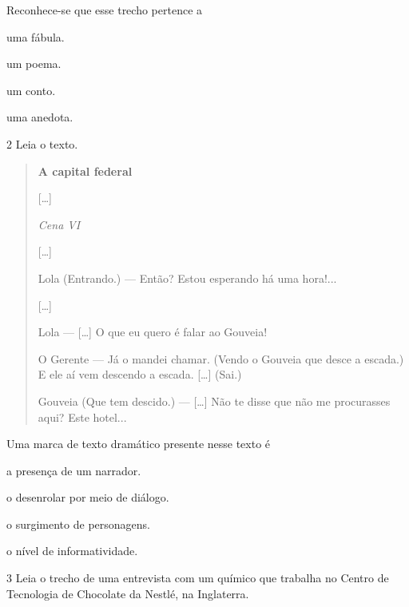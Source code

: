 Reconhece-se que esse trecho pertence a

\begin{escolha}
\item uma fábula.

\item um poema.

\item um conto.

\item uma anedota.
\end{escolha}



\num{2} Leia o texto.

\begin{quote}
\textbf{A capital federal}

{[}\ldots{}{]}

\textit{Cena VI}

{[}\ldots{}{]}

Lola (Entrando.) --- Então? Estou esperando há uma hora!...

{[}\ldots{}{]}

Lola --- {[}\ldots{}{]} O que eu quero é falar ao Gouveia!

O Gerente --- Já o mandei chamar. (Vendo o Gouveia que desce a escada.)
E ele aí vem descendo a escada. {[}\ldots{}{]} (Sai.)

Gouveia (Que tem descido.) --- {[}\ldots{}{]} Não te disse que não me
procurasses aqui? Este hotel...

\end{quote}

Uma marca de texto dramático presente nesse texto é

\begin{escolha}
\item a presença de um narrador.

\item o desenrolar por meio de diálogo.

\item o surgimento de personagens.

\item o nível de informatividade.
\end{escolha}



\num{3} Leia o trecho de uma entrevista com um químico que
trabalha no Centro de Tecnologia de Chocolate da Nestlé, na Inglaterra.

